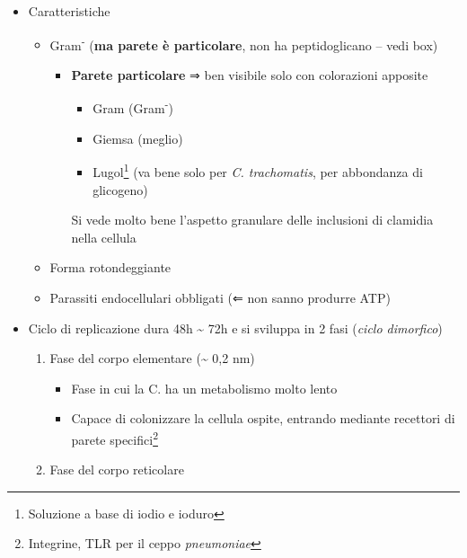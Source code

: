 \documentclass[italian,]{article}
\providecommand{\tightlist}{%
  \setlength{\itemsep}{0pt}\setlength{\parskip}{0pt}}
\begin{document}
\begin{itemize}
\tightlist
\item
  Caratteristiche

  \begin{itemize}
  \tightlist
  \item
    Gram\textsuperscript{-} (\textbf{ma parete è particolare}, non ha
    peptidoglicano -- vedi box)

    \begin{itemize}
    \tightlist
    \item
      \textbf{Parete particolare} ⇒ ben visibile solo con colorazioni
      apposite

      \begin{itemize}
      \tightlist
      \item
        Gram (Gram\textsuperscript{-})
      \item
        Giemsa (meglio)
      \item
        Lugol\footnote{Soluzione a base di iodio e ioduro} (va bene solo
        per \emph{C. trachomatis}, per abbondanza di glicogeno)
      \end{itemize}

      Si vede molto bene l'aspetto granulare delle inclusioni di
      clamidia nella cellula
    \end{itemize}
  \item
    Forma rotondeggiante
  \item
    Parassiti endocellulari obbligati (⇐ non sanno produrre ATP)
  \end{itemize}
\item
  Ciclo di replicazione dura 48h \textasciitilde{} 72h e si sviluppa in
  2 fasi (\emph{ciclo dimorfico})

  \begin{enumerate}
  \def\labelenumi{\arabic{enumi}.}
  \tightlist
  \item
    Fase del corpo elementare (\textasciitilde{} 0,2 nm)

    \begin{itemize}
    \tightlist
    \item
      Fase in cui la C. ha un metabolismo molto lento
    \item
      Capace di colonizzare la cellula ospite, entrando mediante
      recettori di parete specifici\footnote{Integrine, TLR per il ceppo
        \emph{pneumoniae}}
    \end{itemize}
  \item
    Fase del corpo reticolare


\end{enumerate}
\end{itemize}
\end{document}
